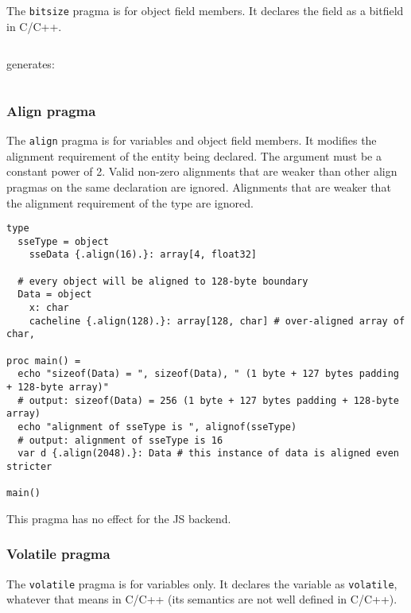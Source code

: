 The \texttt{bitsize} pragma is for object field members. It declares the
field as a bitfield in C/C++.

\begin{verbatim}
\end{verbatim}

generates:

\begin{verbatim}
\end{verbatim}

\hypertarget{align-pragma}{%
\subsubsection{Align pragma}\label{align-pragma}}

The \texttt{align} pragma is for variables and object field members. It
modifies the alignment requirement of the entity being declared. The
argument must be a constant power of 2. Valid non-zero alignments that
are weaker than other align pragmas on the same declaration are ignored.
Alignments that are weaker that the alignment requirement of the type
are ignored.

\begin{verbatim}
type
  sseType = object
    sseData {.align(16).}: array[4, float32]

  # every object will be aligned to 128-byte boundary
  Data = object
    x: char
    cacheline {.align(128).}: array[128, char] # over-aligned array of char,

proc main() =
  echo "sizeof(Data) = ", sizeof(Data), " (1 byte + 127 bytes padding + 128-byte array)"
  # output: sizeof(Data) = 256 (1 byte + 127 bytes padding + 128-byte array)
  echo "alignment of sseType is ", alignof(sseType)
  # output: alignment of sseType is 16
  var d {.align(2048).}: Data # this instance of data is aligned even stricter

main()
\end{verbatim}

This pragma has no effect for the JS backend.

\hypertarget{volatile-pragma}{%
\subsubsection{Volatile pragma}\label{volatile-pragma}}

The \texttt{volatile} pragma is for variables only. It declares the
variable as \texttt{volatile}, whatever that means in C/C++ (its
semantics are not well defined in C/C++).

